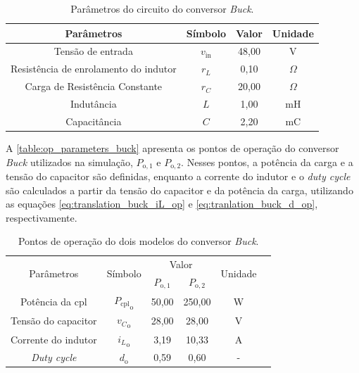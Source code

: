 \vspace{8pt}
\begin{table}[H]
  \centering
  \begin{tabular}{cccc}
    \toprule
    Parâmetros & Símbolo  & Valor & Unidade \\
    \midrule
    Tensão de entrada & $v_{\mathrm{in}}$ & 48,00 & V \\
    Resistência de enrolamento do indutor & $r_L$ & 0,10 & $\Omega$ \\
    Carga de Resistência Constante & $r_{C}$ & 20,00 & $\Omega$ \\
    Indutância & $L$ & 1,00 & mH \\
    Capacitância  & $C$ & 2,20 & mC \\
    \bottomrule
  \end{tabular}
  \caption{Parâmetros do circuito do conversor \textit{Buck}.}
  \label{table:circuit_parameter_buck}
\end{table}

A \autoref{table:op_parameters_buck} apresenta os pontos de operação do conversor \textit{Buck} utilizados na simulação, $P_{\mathrm{o}, 1}$ e $P_{\mathrm{o}, 2}$. Nesses pontos, a potência da carga e a tensão do capacitor são definidas, enquanto a corrente do indutor e o \textit{\textit{duty cycle}} são calculados a partir da tensão do capacitor e da potência da carga, utilizando as equações \eqref{eq:translation_buck_iL_op} e \eqref{eq:tranlation_buck_d_op}, respectivamente.

\vspace{8pt}
\begin{table}[H]
  \centering
  \setlength{\tabcolsep}{10pt}
  \begin{tabular}{cccccc}
    \toprule
    \multirow{2}{*}{\centering Parâmetros} & \multirow{2}{*}{\centering Símbolo} & \multicolumn{2}{c}{\centering Valor} & \multirow{2}{*}{\centering Unidade} \\
    \cmidrule{3-4}
     &  & $P_{\mathrm{o}, 1}$ & $P_{\mathrm{o}, 2}$ &  \\
    \midrule
    Potência da \acrshort{cpl} & ${P_{\mathrm{cpl}}}_{\mathrm{o}}$ & 50,00  & 250,00 & W \\
    Tensão do capacitor & ${v_C}_{\mathrm{o}}$ & 28,00 & 28,00  & V \\
    Corrente do indutor & ${i_L}_{\mathrm{o}}$ & 3,19 & 10,33 & A \\
    \textit{\textit{Duty cycle}} & $d_{\mathrm{o}}$ & 0,59 & 0,60 & - \\  
    \bottomrule
  \end{tabular}
  \caption{Pontos de operação do dois modelos do conversor \textit{Buck}.}
  \label{table:op_parameters_buck}
\end{table}

